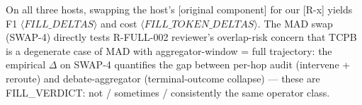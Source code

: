 On all three hosts, swapping the host's [original component] for our [R-x] yields F1 $\langle FILL\_DELTAS\rangle$ and cost $\langle FILL\_TOKEN\_DELTAS\rangle$. The MAD swap (SWAP-4) directly tests R-FULL-002 reviewer's overlap-risk concern that TCPB is a degenerate case of MAD with aggregator-window = full trajectory: the empirical $\Delta$ on SWAP-4 quantifies the gap between per-hop audit (intervene + reroute) and debate-aggregator (terminal-outcome collapse) --- these are \langle FILL\_VERDICT: not / sometimes / consistently \rangle the same operator class.






